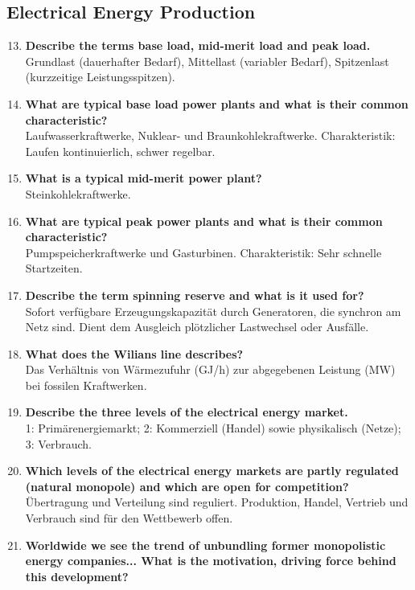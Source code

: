 \documentclass{article}
\begin{document}
\subsection*{Electrical Energy Production}
\begin{enumerate}
    \setcounter{enumi}{12}
    \item \textbf{Describe the terms base load, mid-merit load and peak load.} \\
    Grundlast (dauerhafter Bedarf), Mittellast (variabler Bedarf), Spitzenlast (kurzzeitige Leistungsspitzen).
    \item \textbf{What are typical base load power plants and what is their common characteristic?} \\
    Laufwasserkraftwerke, Nuklear- und Braunkohlekraftwerke. Charakteristik: Laufen kontinuierlich, schwer regelbar.
    \item \textbf{What is a typical mid-merit power plant?} \\
    Steinkohlekraftwerke.
    \item \textbf{What are typical peak power plants and what is their common characteristic?} \\
    Pumpspeicherkraftwerke und Gasturbinen. Charakteristik: Sehr schnelle Startzeiten.
    \item \textbf{Describe the term spinning reserve and what is it used for?} \\
    Sofort verfügbare Erzeugungskapazität durch Generatoren, die synchron am Netz sind. Dient dem Ausgleich plötzlicher Lastwechsel oder Ausfälle.
    \item \textbf{What does the Wilians line describes?} \\
    Das Verhältnis von Wärmezufuhr (GJ/h) zur abgegebenen Leistung (MW) bei fossilen Kraftwerken.
    \item \textbf{Describe the three levels of the electrical energy market.} \\
    1: Primärenergiemarkt; 2: Kommerziell (Handel) sowie physikalisch (Netze); 3: Verbrauch.
    \item \textbf{Which levels of the electrical energy markets are partly regulated (natural monopole) and which are open for competition?} \\
    Übertragung und Verteilung sind reguliert. Produktion, Handel, Vertrieb und Verbrauch sind für den Wettbewerb offen.
    \item \textbf{Worldwide we see the trend of unbundling former monopolistic energy companies... What is the motivation, driving force behind this development?} \\

\end{enumerate}
\end{document}
